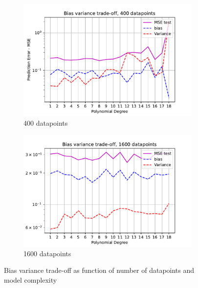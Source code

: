 \documentclass[11pt, a4paper]{article}
\begin{document}
\begin{figure}
  \centering
  \begin{subfigure}{0.49\textwidth}
    \centering
    \includegraphics[width=\textwidth]{figures/EX2_model_complexity_bias_var_function_n_20.pdf}
    \caption{400 datapoints}
    \label{fig:bias_var_n_20}
  \end{subfigure}
  \hfill
  \begin{subfigure}{0.49\textwidth}
    \centering
    \includegraphics[width=\textwidth]{figures/EX2_model_complexity_bias_var_function_n_40.pdf}
    \caption{1600 datapoints}
    \label{fig:bias_var_n_30}
  \end{subfigure}

  \caption{Bias variance trade-off as function of number of datapoints and model complexity}
  \label{fig:bias_var}
\end{figure}
\end{document}
